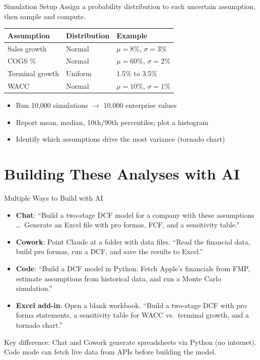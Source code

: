\documentclass[aspectratio=169]{beamer}
\begin{document}
\begin{frame}{Simulation Setup}
Assign a probability distribution to each uncertain assumption, then sample and compute.
\vspace{0.2cm}
\begin{center}
\small
\begin{tabular}{@{} l l l @{}}
\toprule
\textbf{Assumption} & \textbf{Distribution} & \textbf{Example} \\
\midrule
Sales growth & Normal & $\mu = 8\%$, $\sigma = 3\%$ \\
COGS \% & Normal & $\mu = 60\%$, $\sigma = 2\%$ \\
Terminal growth & Uniform & 1.5\% to 3.5\% \\
WACC & Normal & $\mu = 10\%$, $\sigma = 1\%$ \\
\bottomrule
\end{tabular}
\end{center}
\vspace{0.1cm}
\begin{itemize}
  \item Run 10{,}000 simulations $\rightarrow$ 10{,}000 enterprise values
  \item Report mean, median, 10th/90th percentiles; plot a histogram
  \item Identify which assumptions drive the most variance (tornado chart)
\end{itemize}
\end{frame}

\section{Building These Analyses with AI}

\begin{frame}{Multiple Ways to Build with AI}
\begin{itemize}
  \item \textbf{Chat}: ``Build a two-stage DCF model for a company with these assumptions \ldots\ Generate an Excel file with pro formas, FCF, and a sensitivity table.''
  \item \textbf{Cowork}: Point Claude at a folder with data files. ``Read the financial data, build pro formas, run a DCF, and save the results to Excel.''
  \item \textbf{Code}: ``Build a DCF model in Python. Fetch Apple's financials from FMP, estimate assumptions from historical data, and run a Monte Carlo simulation.''
  \item \textbf{Excel add-in}: Open a blank workbook. ``Build a two-stage DCF with pro forma statements, a sensitivity table for WACC vs.\ terminal growth, and a tornado chart.''
\end{itemize}
\vspace{0.2cm}
\alert{Key difference:} Chat and Cowork generate spreadsheets via Python (no internet).  Code mode can \alert{fetch live data} from APIs before building the model.
\end{frame}
\end{document}
